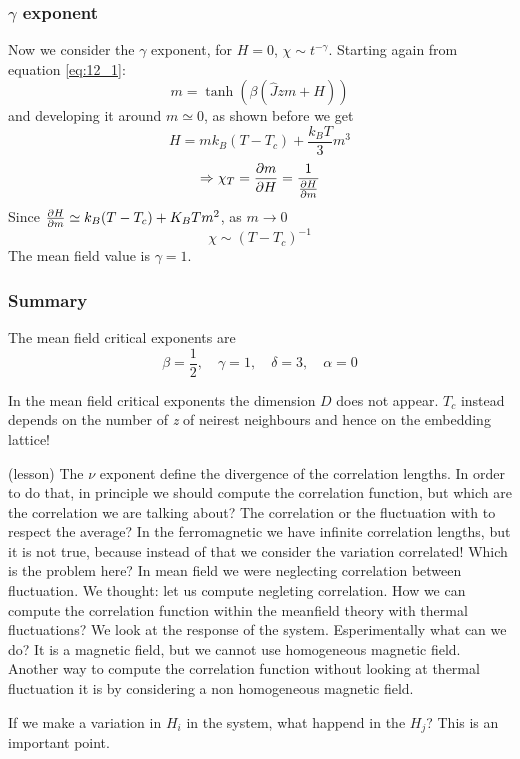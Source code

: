 \documentclass[../main/main.tex]{subfiles}
\begin{document}
\subsubsection{\( \gamma   \) exponent}
Now we consider the \( \gamma   \) exponent, for \( H=0 \), \( \chi \sim t^{-\gamma  } \).   Starting again from equation \eqref{eq:12_1}:
\begin{equation*}
  m = \tanh (\beta (\hat{J}zm+H ))
\end{equation*}
and developing it around \( m \simeq 0 \), as shown before we get
\begin{equation}
  H = m k_B (T-T_c)+ \frac{k_B T}{3}m^3
\end{equation}
\begin{equation}
  \Rightarrow \chi _T = \pdv{m}{H} = \frac{1}{\pdv{H}{m} }
\end{equation}
Since \( \pdv{H}{m} \simeq k_B (T-T_c) + K_B T m^2 \), as \( m \rightarrow 0 \)
\begin{equation}
  \chi \sim (T-T_c)^{-1}
\end{equation}
The mean field value is \( \gamma =1  \).

\subsubsection{Summary}
The mean field critical exponents are
\begin{equation}
  \beta = \frac{1}{2}, \quad \gamma =1, \quad \delta =3, \quad \alpha =0
\end{equation}
\begin{remark}
In the mean field critical exponents the dimension \( D \) does not appear. \( T_c \) instead depends on the number of \emph{z} of neirest neighbours and hence on the embedding lattice!
\end{remark}
\begin{remark}
  (lesson)
  The \( \nu  \) exponent define the divergence of the correlation lengths. In order to do that, in principle we should compute the correlation function, but which are the correlation we are talking about? The correlation or the fluctuation with to respect the average? In the ferromagnetic we have infinite correlation lengths, but it is not true, because instead of that we consider the variation correlated!
  Which is the problem here? In mean field we were neglecting correlation between fluctuation.
  We thought: let us compute negleting correlation.
  How we can compute the correlation function within the meanfield theory with thermal fluctuations? We look at the response of the system. Esperimentally what can we do? It is a magnetic field, but we cannot use homogeneous magnetic field. Another way to compute the correlation function without looking at thermal fluctuation it is by considering a non homogeneous magnetic field.

  If we make a variation in \( H_i \) in the system, what happend in the \( H_j \)? This is an important point.
\end{remark}
\end{document}
